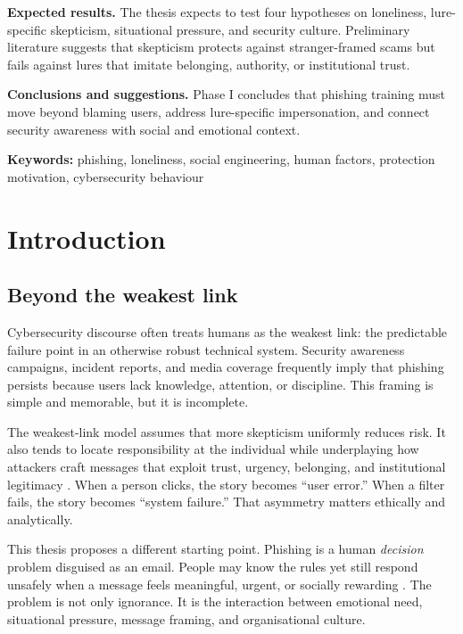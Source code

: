 \documentclass[UKenglish,12pt]{master-style}
\begin{document}
\textbf{Expected results.} The thesis expects to test four hypotheses on loneliness, lure-specific skepticism, situational pressure, and security culture. Preliminary literature suggests that skepticism protects against stranger-framed scams but fails against lures that imitate belonging, authority, or institutional trust.

\textbf{Conclusions and suggestions.} Phase I concludes that phishing training must move beyond blaming users, address lure-specific impersonation, and connect security awareness with social and emotional context.

\noindent\textbf{Keywords:} phishing, loneliness, social engineering, human factors, protection motivation, cybersecurity behaviour

\tableofcontents
\listoffigures
\listoftables

\mainmatter

\chapter{Introduction}

\section{Beyond the weakest link}
\label{sec:weakest-link}

Cybersecurity discourse often treats humans as the weakest link: the predictable failure point in an otherwise robust technical system. Security awareness campaigns, incident reports, and media coverage frequently imply that phishing persists because users lack knowledge, attention, or discipline. This framing is simple and memorable, but it is incomplete.

The weakest-link model assumes that more skepticism uniformly reduces risk. It also tends to locate responsibility at the individual while underplaying how attackers craft messages that exploit trust, urgency, belonging, and institutional legitimacy \parencite{hadnagy2018social,conteh2016cybersecurity}. When a person clicks, the story becomes ``user error.'' When a filter fails, the story becomes ``system failure.'' That asymmetry matters ethically and analytically.

This thesis proposes a different starting point. Phishing is a human \emph{decision} problem disguised as an email. People may know the rules yet still respond unsafely when a message feels meaningful, urgent, or socially rewarding \parencite{parker2020contributing,tsai2021phishing}. The problem is not only ignorance. It is the interaction between emotional need, situational pressure, message framing, and organisational culture.
\end{document}
